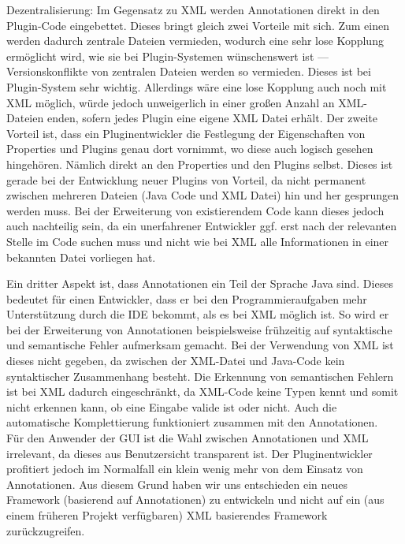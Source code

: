 \documentclass[a4paper, 11pt]{article} %
\begin{document}
Dezentralisierung: Im Gegensatz zu XML werden Annotationen direkt in den Plugin-Code eingebettet. Dieses bringt gleich zwei Vorteile mit sich. Zum einen werden dadurch zentrale Dateien vermieden, wodurch eine sehr lose Kopplung ermöglicht wird, wie sie bei Plugin-Systemen wünschenswert ist --- Versionskonflikte von zentralen Dateien werden so vermieden. Dieses ist bei Plugin-System sehr wichtig. Allerdings wäre eine lose Kopplung auch noch mit XML möglich, würde jedoch unweigerlich in einer großen Anzahl an XML-Dateien enden, sofern jedes Plugin eine eigene XML Datei erhält. Der zweite Vorteil ist, dass ein Pluginentwickler die Festlegung der Eigenschaften von Properties und Plugins genau dort vornimmt, wo diese auch logisch gesehen hingehören. Nämlich direkt an den Properties und den Plugins selbst. Dieses ist gerade bei der Entwicklung neuer Plugins von Vorteil, da nicht permanent zwischen mehreren Dateien (Java Code und XML Datei) hin und her gesprungen werden muss. Bei der Erweiterung von existierendem Code kann dieses jedoch auch nachteilig sein, da ein unerfahrener Entwickler ggf. erst nach der relevanten Stelle im Code suchen muss und nicht wie bei XML alle Informationen in einer bekannten Datei vorliegen hat.

Ein dritter Aspekt ist, dass Annotationen ein Teil der Sprache Java sind. Dieses bedeutet für einen Entwickler, dass er bei den Programmieraufgaben mehr Unterstützung durch die IDE bekommt, als es bei XML möglich ist. So wird er bei der Erweiterung von Annotationen beispielsweise frühzeitig auf syntaktische und semantische Fehler aufmerksam gemacht. Bei der Verwendung von XML ist dieses nicht gegeben, da zwischen der XML-Datei und Java-Code kein syntaktischer Zusammenhang besteht. Die Erkennung von semantischen Fehlern ist bei XML dadurch eingeschränkt, da XML-Code keine Typen kennt und somit nicht erkennen kann, ob eine Eingabe valide ist oder nicht. Auch die automatische Komplettierung funktioniert zusammen mit den Annotationen.\\

Für den Anwender der GUI ist die Wahl zwischen Annotationen und XML irrelevant, da dieses aus Benutzersicht transparent ist. Der Pluginentwickler profitiert jedoch im Normalfall ein klein wenig mehr von dem Einsatz von Annotationen. Aus diesem Grund haben wir uns entschieden ein neues Framework (basierend auf Annotationen) zu entwickeln und nicht auf ein (aus einem früheren Projekt verfügbaren) XML basierendes Framework zurückzugreifen.

\end{document}
